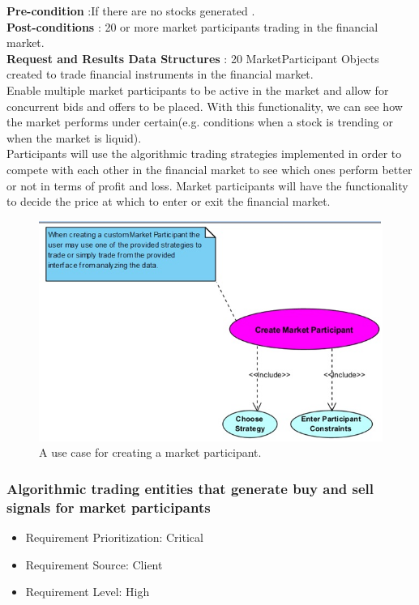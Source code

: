 \documentclass[12pt]{article}
\begin{document}
				\textbf{Pre-condition} :If there are no stocks generated .\\
				\textbf{Post-conditions} : 20 or more market participants trading in the financial market.\\ 
				\textbf{Request and Results Data Structures} : 20 MarketParticipant Objects created to trade financial instruments in the financial market.\\ 
								
				Enable multiple market participants to be active in the market and allow for concurrent bids and offers to be placed. With this functionality, we can see how the market performs under certain(e.g. conditions when a stock is trending or when the market is liquid). \\
				
				Participants will use the algorithmic trading strategies implemented in order to compete with each other in the financial market to see which ones perform better or not in terms of profit and loss. Market participants will have the functionality to decide the price at which to enter or exit the financial market. 
				
				\begin{figure}[th]
								\centering
								\includegraphics[scale=0.6]{./USE_CASE_Create_Market_Participant_Financial_Market_Simulator}
								\caption{A use case for creating a market participant.}
								\label{domain objects}
				\end{figure}
				
				\subsubsection{Algorithmic trading entities that generate buy and sell signals for market participants}
				\begin{itemize}
					\item Requirement Prioritization: Critical
					\item Requirement Source: Client 	
					\item Requirement Level: High
				\end{itemize}
				
\end{document}
